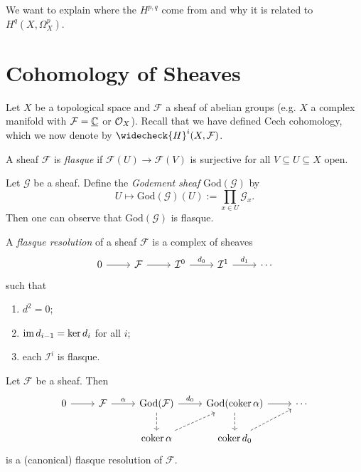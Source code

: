 \begin{remark}
  We want to explain where the $H^{p, q}$
  come from and why it is related to
  $H^q(X, \Omega_X^p)$.
\end{remark}

\section{Cohomology of Sheaves}

\begin{remark}
  Let $X$ be a topological space and
  $\mathcal{F}$ a sheaf of abelian groups
  (e.g. $X$ a complex manifold with
  $\mathcal{F} = \underline{\mathbb{C}}$ or $\mathcal{O}_X$).
  Recall that we have defined Cech
  cohomology, which we now denote by
  $\widecheck{H}^i(X, \mathcal{F})$.
\end{remark}

\begin{definition}
  A sheaf $\mathcal{F}$ is \emph{flasque}
  if $\mathcal{F}(U) \to \mathcal{F}(V)$
  is surjective for all $V \subseteq U \subseteq X$
  open.
\end{definition}


\begin{example}
  Let $\mathcal{G}$ be a sheaf. Define the
  \emph{Godement sheaf} $\mathrm{God}(\mathcal{G})$
  by
  \[
    U \longmapsto
    \mathrm{God}(\mathcal{G})(U)
    := \prod_{x \in U} \mathcal{G}_x.
  \]
  Then one can observe that
  $\mathrm{God}(\mathcal{G})$
  is flasque.
\end{example}

\begin{definition}
  A \emph{flasque resolution} of a sheaf
  $\mathcal{F}$ is a complex of sheaves
  \[
    \begin{tikzcd}
      0 \ar[r] & \mathcal{F}
      \ar[r] & \mathcal{I}^0
      \ar[r, "d_0"] & \mathcal{I}^1
      \ar[r, "d_1"] & \cdots
    \end{tikzcd}
  \]
  such that
  \begin{enumerate}
    \item $d^2 = 0$;
    \item $\operatorname{im} d_{i - 1} = \ker d_i$ for
      all $i$;
    \item each $\mathcal{I}^i$ is flasque.
  \end{enumerate}
\end{definition}

\begin{example}
  Let $\mathcal{F}$ be a sheaf. Then
  \[
    \begin{tikzcd}
      0 \ar[r] & \mathcal{F}
      \ar[r, "\alpha"] & \mathrm{God}(\mathcal{F}) \ar[d, dashed] \ar[r, "d_0"] & \mathrm{God}(\coker \alpha) \ar[d, dashed] \ar[r] & \cdots \\
                       & & \coker \alpha \ar[ur, dashed] & \coker d_0 \ar[ur, dashed]
    \end{tikzcd}
  \]
  is a (canonical) flasque resolution of
  $\mathcal{F}$.
\end{example}


